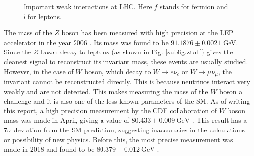 \documentclass[a4paper]{report}
\numberwithin{equation}{section}
\begin{document}
\begin{figure}[htb!]
	\centering
	\quad
	\centering
	\quad
	\centering
	\caption{Important weak interactions at LHC. Here $f$ stands for fermion and $l$ for leptons.}
	\label{fig:weak_int}
\end{figure}

The mass of the $Z$ boson has been measured with high precision at the LEP accelerator in the year 2006 \cite{ALEPH:2005ab}. Its mass was found to be $91.1876 \pm 0.0021$ GeV. Since the $Z$ boson decay to leptons (as shown in Fig. \ref{subfig:ztoll}) gives the cleanest signal to reconstruct its invariant mass, these events are usually studied. However, in the case of $W$ boson, which decay to $W \rightarrow e\nu_e$ or $W \rightarrow \mu \nu_{\mu}$, the invariant cannot be reconstructed directly. This is because neutrinos interact very weakly and are not detected. This makes measuring the mass of the $W$ boson a challenge and it is also one of the less known parameters of the SM. As of writing this report, a high precision measurement by the CDF collaboration of $W$ boson mass was made in April, giving a value of $80.433 \pm 0.009 \ \text{GeV}$ \cite{CDF:2022hxs}. This result has a 7$\sigma$ deviation from the SM prediction, suggesting inaccuracies in the calculations or possibility of new physics. Before this, the most precise measurement was made in 2018 and found to be $80.379 \pm 0.012 \ \text{GeV}$ \cite{PhysRevD.98.030001}. 
\end{document}
